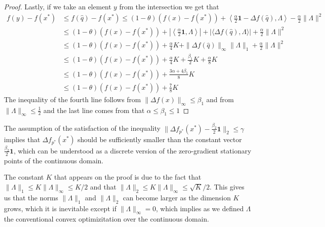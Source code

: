 \documentclass[11pt,a4paper,openright,oneside]{book}
\numberwithin{equation}{section}
\begin{document}
{\begin{proof}
Lastly, if we take an element $y$ from the intersection we get that
\begin{align*}
    f(y) - f(x^*) &\leqslant f(\hat q) - f(x^*) \leqslant (1 - \theta) (f(x) - f(x^*)) + \left\langle \frac{\alpha}{2} \textbf{1} - \Delta f(\hat q), \Lambda \right\rangle - \frac{\alpha}{2} \| \Lambda \|^2 \\
                  &\leqslant (1 - \theta) (f(x) - f(x^*)) + \left| \left\langle \frac{\alpha}{2} \textbf{1}, \Lambda \right\rangle \right| + |\langle \Delta f(\hat q), \Lambda \rangle| + \frac{\alpha}{2} \| \Lambda \|^2 \\
                  &\leqslant (1 - \theta) (f(x) - f(x^*)) + \frac{\alpha}{4} K + \| \Delta f(\hat q) \|_\infty \| \Lambda \|_1 + \frac{\alpha}{2} \|\Lambda \|^2 \\
                  &\leqslant (1 - \theta) (f(x) - f(x^*)) + \frac{\alpha}{4}K + \frac{\beta_1}{2}K + \frac{\alpha}{8} K \\
                  &\leqslant (1-\theta) (f(x) - f(x^*)) + \frac{3\alpha + 4\beta_1}{8}K \\
                  &\leqslant (1-\theta) (f(x) - f(x^*)) + \frac{7}{8} K
\end{align*}
The inequality of the fourth line follows from $\|\Delta f(x)\|_\infty \leqslant \beta_1$ and from $\|\Lambda \|_\infty \leqslant \frac{1}{2}$
and the last line comes from that $\alpha \leqslant \beta_1 \leqslant 1$
\end{proof}

The assumption of the satisfaction of the 
inequality $\|\Delta f_{p^*}(x^*) - \frac{\beta_2}{2} \textbf{1}\|_2 \leqslant \gamma$ implies that
$\Delta f_{p^*}(x^*)$ should be sufficiently smaller than the constant vector $\frac{\beta_2}{2} \textbf{1}$, which
can be understood as a discrete version of the zero-gradient stationary points of the continuous domain.

The constant $K$ that appears on the proof is due to the fact that $\|\Lambda \|_1 \leqslant K\|\Lambda \|_\infty \leqslant K/2$ and that
$\|\Lambda\|_2 \leqslant K\|\Lambda \|_\infty \leqslant \sqrt{K}/2$. This gives us that the norms $\|\Lambda \|_1$ and $\|\Lambda \|_2$ can become
larger as the dimension $K$ grows, which it is inevitable except if $\|\Lambda \|_\infty=0$, which implies as we defined $\Lambda$ the conventional
convex optimizitation over the continuous domain.

}
\end{document}
